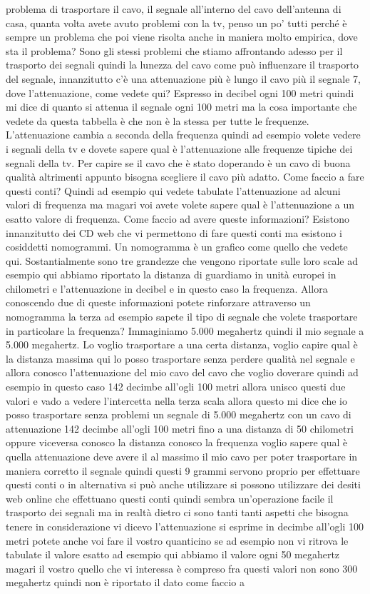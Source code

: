 problema di trasportare il cavo, il segnale all'interno del cavo dell'antenna di casa, quanta volta avete avuto problemi con la tv, penso un po' tutti perché è sempre un problema che poi viene risolta anche in maniera molto empirica, dove sta il problema? Sono gli stessi problemi che stiamo affrontando adesso per il trasporto dei segnali quindi la lunezza del cavo come può influenzare il trasporto del segnale, innanzitutto c'è una attenuazione più è lungo il cavo più il segnale 7, dove l'attenuazione, come vedete qui? Espresso in decibel ogni 100 metri quindi mi dice di quanto si attenua il segnale ogni 100 metri ma la cosa importante che vedete da questa tabbella è che non è la stessa per tutte le frequenze. L'attenuazione cambia a seconda della frequenza quindi ad esempio volete vedere i segnali della tv e dovete sapere qual è l'attenuazione alle frequenze tipiche dei segnali della tv. Per capire se il cavo che è stato doperando è un cavo di buona qualità altrimenti appunto bisogna scegliere il cavo più adatto. Come faccio a fare questi conti? Quindi ad esempio qui vedete tabulate l'attenuazione ad alcuni valori di frequenza ma magari voi avete volete sapere qual è l'attenuazione a un esatto valore di frequenza. Come faccio ad avere queste informazioni? Esistono innanzitutto dei CD web che vi permettono di fare questi conti ma esistono i cosiddetti nomogrammi. Un nomogramma è un grafico come quello che vedete qui. Sostantialmente sono tre grandezze che vengono riportate sulle loro scale ad esempio qui abbiamo riportato la distanza di guardiamo in unità europei in chilometri e l'attenuazione in decibel e in questo caso la frequenza. Allora conoscendo due di queste informazioni potete rinforzare attraverso un nomogramma la terza ad esempio sapete il tipo di segnale che volete trasportare in particolare la frequenza? Immaginiamo 5.000 megahertz quindi il mio segnale a 5.000 megahertz. Lo voglio trasportare a una certa distanza, voglio capire qual è la distanza massima qui lo posso trasportare senza perdere qualità nel segnale e allora conosco l'attenuazione del mio cavo del cavo che voglio doverare quindi ad esempio in questo caso 142 decimbe all'ogli 100 metri allora unisco questi due valori e vado a vedere l'intercetta nella terza scala allora questo mi dice che io posso trasportare senza problemi un segnale di 5.000 megahertz con un cavo di attenuazione 142 decimbe all'ogli 100 metri fino a una distanza di 50 chilometri oppure viceversa conosco la distanza conosco la frequenza voglio sapere qual è quella attenuazione deve avere il al massimo il mio cavo per poter trasportare in maniera corretto il segnale quindi questi 9 grammi servono proprio per effettuare questi conti o in alternativa si può anche utilizzare si possono utilizzare dei desiti web online che effettuano questi conti quindi sembra un'operazione facile il trasporto dei segnali ma in realtà dietro ci sono tanti tanti aspetti che bisogna tenere in considerazione vi dicevo l'attenuazione si esprime in decimbe all'ogli 100 metri potete anche voi fare il vostro quanticino se ad esempio non vi ritrova le tabulate il valore esatto ad esempio qui abbiamo il valore ogni 50 megahertz magari il vostro quello che vi interessa è compreso fra questi valori non sono 300 megahertz quindi non è riportato il dato come faccio a 